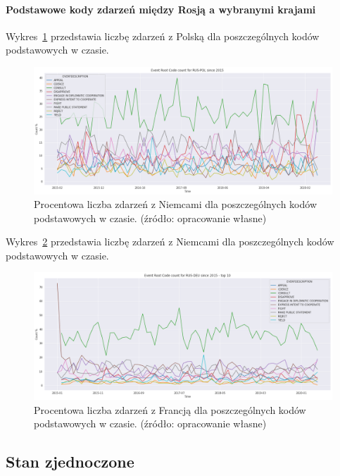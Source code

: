 \documentclass[11pt]{report}
\begin{document}
    \paragraph{Podstawowe kody zdarzeń między Rosją a wybranymi krajami}

    Wykres~\ref{fig:RUSPOLERC} przedstawia liczbę zdarzeń z Polską dla poszczególnych kodów podstawowych w czasie.
    \begin{figure}[!htp]
        \centering
        \includegraphics[width=\linewidth]{fig/RUS/RUSPOLERCperc.png}
        \caption{Procentowa liczba zdarzeń z Niemcami dla poszczególnych kodów podstawowych w czasie. (źródło: opracowanie własne)}
        \label{fig:RUSPOLERC}
    \end{figure}

    Wykres~\ref{fig:RUSRUSERC} przedstawia liczbę zdarzeń z Niemcami dla poszczególnych kodów podstawowych w czasie.
    \begin{figure}[!htp]
        \centering
        \includegraphics[width=\linewidth]{fig/RUS/RUSDEUERCperc.png}
        \caption{Procentowa liczba zdarzeń z Francją dla poszczególnych kodów podstawowych w czasie. (źródło: opracowanie własne)}
        \label{fig:RUSRUSERC}
    \end{figure}

    \subsection{Stan zjednoczone}
\end{document}
